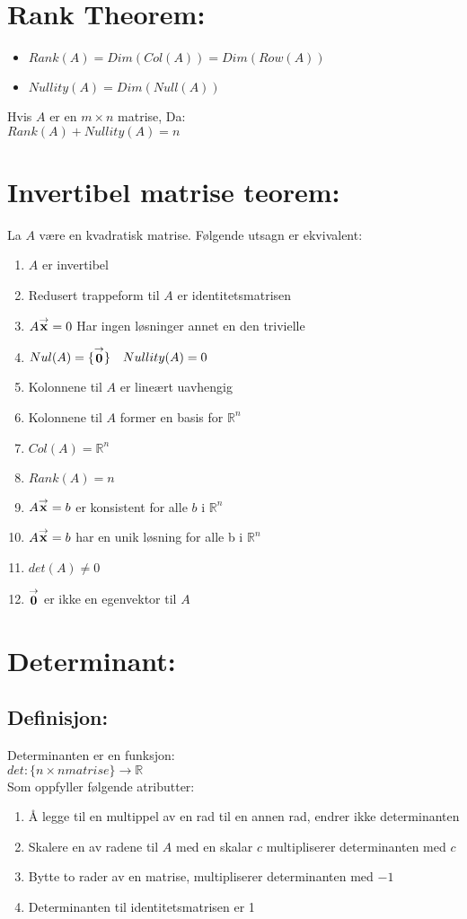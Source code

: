 \documentclass[12pt,a4paper,twocolumn,twoside]{article}
\def\real{\mathbb{R}}
\def\vector#1{\bold{\stackrel{\rightarrow}{#1}}}
\begin{document}
\section*{Rank Theorem:}
\begin{itemize}[topsep=0pt,itemsep=0pt, partopsep=0pt]
    \item $Rank(A) = Dim(Col(A)) = Dim(Row(A))$
    \item $Nullity(A) = Dim(Null(A))$
\end{itemize}
Hvis $A$ er en $m \times n$ matrise, Da:\\ $Rank(A)+Nullity(A)=n$
\section*{Invertibel matrise teorem:}
La $A$ være en kvadratisk matrise. Følgende utsagn er ekvivalent:
\begin{enumerate}[topsep=0pt,itemsep=0pt, partopsep=0pt]
    \item $A$ er invertibel
    \item Redusert trappeform til $A$ er identitetsmatrisen
    \item $A\vector{x}=0$ Har ingen løsninger annet en den trivielle
    \item $Nul(A) = \{\vector{0}\}\quad Nullity(A) = 0$
    \item Kolonnene til $A$ er lineært uavhengig
    \item Kolonnene til $A$ former en basis for $\real^n$
    \item $Col(A) = \real^n$
    \item $Rank(A)=n$
    \item $A\vector{x}=b$ er konsistent for alle $b$ i $\real^n$
    \item $A\vector{x}=b$ har en unik løsning for alle b i $\real^n$
    \item $det(A)\neq 0$
    \item $\vector{0}$ er ikke en egenvektor til $A$
\end{enumerate}
\section*{Determinant:}
\subsection*{Definisjon:}
Determinanten er en funksjon:\\
$det:\{n\times n matrise\}\rightarrow \real$\\
Som oppfyller følgende atributter:
\begin{enumerate}[topsep=0pt,itemsep=0pt, partopsep=0pt]
    \item Å legge til en multippel av en rad til en annen rad, endrer ikke determinanten
    \item Skalere en av radene til $A$ med en skalar $c$ multipliserer determinanten med $c$
    \item Bytte to rader av en matrise, multipliserer determinanten med $-1$
    \item Determinanten til identitetsmatrisen er 1
\end{enumerate}
\end{document}
